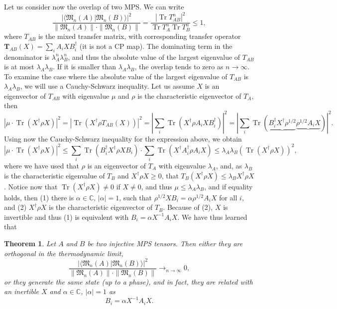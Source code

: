 \documentclass{article}
\newtheorem{theorem}{Theorem}
\newcommand{\tr}{\operatorname{Tr}}
\newcommand{\scalprod}[2]{\langle #1 \vert #2 \rangle}
\begin{document}
Let us consider now the overlap of two MPS. We can write
\begin{equation*}
  \frac{|\scalprod{\mathfrak{M}_n(A)}{\mathfrak{M}_n(B)}|^2}{\|\mathfrak{M}_n(A)\|\cdot\|\mathfrak{M}_n(B)\|} = \frac{|\tr T_{AB}^n|^2}{\tr T_A^n \tr T_B^n} \leq 1,
\end{equation*}
where $T_{AB}$ is the mixed transfer matrix, with corresponding transfer operator $\mathbf{T}_{AB}(X) = \sum_i A_i X B_i^\dagger$ (it is not a CP map). The dominating term in the denominator is $\lambda_A^n\lambda_B^n$, and thus the absolute value of the largest eigenvalue of $T_{AB}$ is at most $\lambda_A \lambda_B$. If it is smaller than $\lambda_A\lambda_B$, the overlap tends to zero as $n\to \infty$. To examine the case where the absolute value of the largest eigenvalue of $T_{AB}$ is $\lambda_A \lambda_B$, we will use a Cauchy-Schwarz inequality. Let us assume $X$ is an eigenvector of $T_{AB}$ with eigenvalue $\mu$ and $\rho$ is the characteristic eigenvector of $T_A$, then 
\begin{equation*}
  \left|\mu \cdot \tr(X^\dagger\rho X)\right|^2 = |\tr(X^\dagger \rho T_{AB}(X) )|^2 = \left|\sum_i \tr(X^\dagger \rho  A_i X B_i^\dagger )\right|^2 = \left|\sum_i \tr(\underbrace{B_i^\dagger  X^\dagger \rho^{1/2}}\underbrace{\rho^{1/2}  A_i X} )\right|^2.
\end{equation*}
Using now the Cauchy-Schwarz inequality for the expression above, we obtain
\begin{equation*}
  \left|\mu \cdot \tr(X^\dagger\rho X)\right|^2  \leq \sum_i \tr(B_i^\dagger X^\dagger \rho X B_i) \cdot \sum_i \tr(X^\dagger A_i^\dagger \rho A_i X) \leq \lambda_A\lambda_B \left(\tr(X^\dagger \rho X)\right)^2,
\end{equation*}
where we have used that $\rho$ is an eigenvector of $T_A$ with eigenvalue $\lambda_A$, and, as $\lambda_B$ is the characteristic eigenvalue of $T_B$ and $X^\dagger \rho X\geq 0$, that $T_B(X^\dagger \rho X)\leq \lambda_B X^\dagger \rho X$. Notice now that $\tr(X^\dagger \rho X) \neq 0$ if $X\neq 0$, and thus $\mu \leq \lambda_A\lambda_B$, and if equality holds, then (1) there is $\alpha\in\mathbb{C}$, $|\alpha|=1$,  such that $\rho^{1/2} X B_i = \alpha \rho^{1/2} A_i X$ for all $i$, and (2) $X^\dagger \rho X$ is the characteristic eigenvector of $T_B$. Because of (2), $X$ is invertible and thus (1) is equivalent with $B_i = \alpha X^{-1} A_i X$. We have thus learned that 
\begin{theorem}
  Let $A$ and $B$ be two injective MPS tensors. Then either they are orthogonal in the thermodynamic limit,
  \begin{equation*}
   \frac{|\scalprod{\mathfrak{M}_n(A)}{\mathfrak{M}_n(B)}|^2}{\|\mathfrak{M}_n(A)\|\cdot\|\mathfrak{M}_n(B)\|} \rightarrow_{n\to\infty} 0,
  \end{equation*} 
  or they generate the same state (up to a phase), and in fact, they are related with an inertible $X$ and $\alpha\in \mathbb{C}$, $|\alpha|=1$ as 
  \begin{equation*}
    B_i = \alpha X^{-1} A_i X.
  \end{equation*}
\end{theorem}
\end{document}
